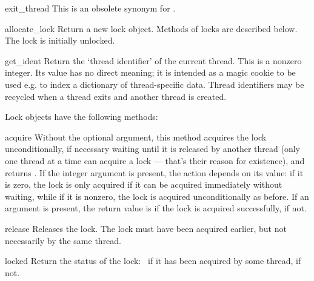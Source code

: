 \begin{funcdesc}{exit_thread}{}
This is an obsolete synonym for .
\end{funcdesc}


\begin{funcdesc}{allocate_lock}{}
Return a new lock object.  Methods of locks are described below.  The
lock is initially unlocked.
\end{funcdesc}

\begin{funcdesc}{get_ident}{}
Return the `thread identifier' of the current thread.  This is a
nonzero integer.  Its value has no direct meaning; it is intended as a
magic cookie to be used e.g. to index a dictionary of thread-specific
data.  Thread identifiers may be recycled when a thread exits and
another thread is created.
\end{funcdesc}


Lock objects have the following methods:

\begin{methoddesc}[lock]{acquire}{}
Without the optional argument, this method acquires the lock
unconditionally, if necessary waiting until it is released by another
thread (only one thread at a time can acquire a lock --- that's their
reason for existence), and returns .  If the integer
 argument is present, the action depends on its
value: if it is zero, the lock is only acquired if it can be acquired
immediately without waiting, while if it is nonzero, the lock is
acquired unconditionally as before.  If an argument is present, the
return value is  if the lock is acquired successfully,
 if not.
\end{methoddesc}

\begin{methoddesc}[lock]{release}{}
Releases the lock.  The lock must have been acquired earlier, but not
necessarily by the same thread.
\end{methoddesc}

\begin{methoddesc}[lock]{locked}{}
Return the status of the lock:\  if it has been acquired by
some thread,  if not.
\end{methoddesc}

